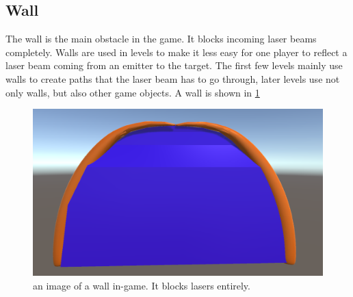		\subsection{Wall} \label{ssec:wall}
			The wall is the main obstacle in the game. It blocks incoming
			laser beams completely. Walls are used in levels to make it 
			less easy for one player to reflect a laser beam coming from
			an emitter to the target. The first few levels mainly use walls
			to create paths that the laser beam has to go through, later
			levels use not only walls, but also other game objects. A wall
			is shown in \ref{fig:wall}
			\begin{figure}[h!]
				\centering
				\includegraphics[scale = 0.15]{Wall}
				\caption{an image of a wall in-game. It blocks lasers entirely.}
				\label{fig:wall}
			\end{figure}
			
